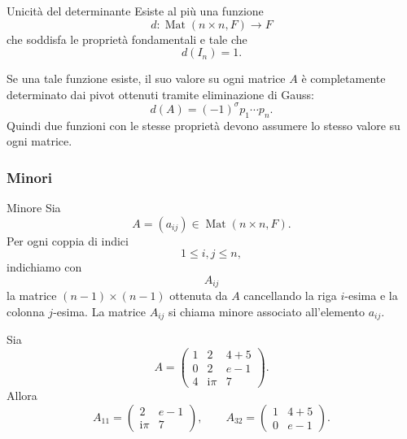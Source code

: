 \documentclass[a4paper]{article}
\begin{document}
\begin{snippetcorollary}{Unicità del determinante}
    Esiste al più una funzione
    \[
        d:\operatorname{Mat}(n\times n,F)\to F
    \]
    che soddisfa le proprietà fondamentali e tale che
    \[
        d(I_n)=1.
    \]
\end{snippetcorollary}

\begin{snippetproof}{}
    Se una tale funzione esiste, il suo valore su ogni matrice \(A\) è completamente determinato dai pivot ottenuti tramite eliminazione di Gauss:
    \[
        d(A)=(-1)^\sigma p_1\cdots p_n.
    \]
    Quindi due funzioni con le stesse proprietà devono assumere lo stesso valore su ogni matrice.
\end{snippetproof}

\subsubsection{Minori}

\begin{snippetdefinition}{Minore}
    Sia
    \[
        A=(a_{ij})\in\operatorname{Mat}(n\times n,F).
    \]
    Per ogni coppia di indici
    \[
        1\leq i,j\leq n,
    \]
    indichiamo con
    \[
        A_{ij}
    \]
    la matrice \((n-1)\times(n-1)\) ottenuta da \(A\) cancellando la riga \(i\)-esima e la colonna \(j\)-esima.
    La matrice \(A_{ij}\) si chiama minore associato all'elemento \(a_{ij}\).
\end{snippetdefinition}

\begin{snippetexample}{}
    Sia
    \[
        A=
        \begin{pmatrix}
            1 & 2 & 4+5\\
            0 & 2 & e-1\\
            4 & \mathrm{i}\pi & 7
        \end{pmatrix}.
    \]
    Allora
    \[
        A_{11}
        =
        \begin{pmatrix}
            2 & e-1\\
            \mathrm{i}\pi & 7
        \end{pmatrix},
        \qquad
        A_{32}
        =
        \begin{pmatrix}
            1 & 4+5\\
            0 & e-1
        \end{pmatrix}.
    \]
\end{snippetexample}
\end{document}
